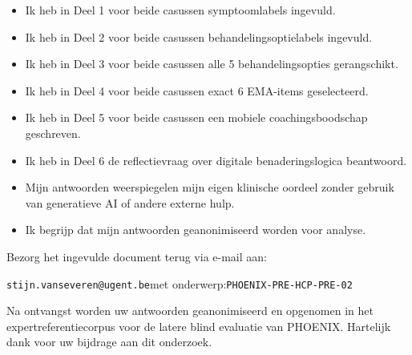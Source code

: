 \documentclass[11pt,a4paper]{article}
\begin{document}
\begin{instrbox}[title=Checklist voor terugbezorging]
\begin{itemize}
\item[$\square$] Ik heb in Deel 1 voor beide casussen symptoomlabels ingevuld.
\item[$\square$] Ik heb in Deel 2 voor beide casussen behandelingsoptielabels ingevuld.
\item[$\square$] Ik heb in Deel 3 voor beide casussen alle 5 behandelingsopties gerangschikt.
\item[$\square$] Ik heb in Deel 4 voor beide casussen exact 6 EMA-items geselecteerd.
\item[$\square$] Ik heb in Deel 5 voor beide casussen een mobiele coachingsboodschap geschreven.
\item[$\square$] Ik heb in Deel 6 de reflectievraag over digitale benaderingslogica beantwoord.
\item[$\square$] Mijn antwoorden weerspiegelen mijn eigen klinische oordeel zonder gebruik van generatieve AI of andere externe hulp.
\item[$\square$] Ik begrijp dat mijn antwoorden geanonimiseerd worden voor analyse.
\end{itemize}
\end{instrbox}

\medskip
Bezorg het ingevulde document terug via e-mail aan:
\begin{center}
\texttt{stijn.vanseveren@ugent.be}\quad met onderwerp:\quad \texttt{PHOENIX-PRE-HCP-PRE-02}
\end{center}

\vspace{0.5em}
\begin{tcolorbox}[colback=AccentBlue,colframe=PrimaryBlue,arc=2mm,boxrule=0.6pt,left=8pt,right=8pt,top=7pt,bottom=7pt]
\small\centering
Na ontvangst worden uw antwoorden geanonimiseerd en opgenomen in het expertreferentiecorpus
voor de latere blind evaluatie van PHOENIX. Hartelijk dank voor uw bijdrage aan dit onderzoek.
\end{tcolorbox}
\end{document}
